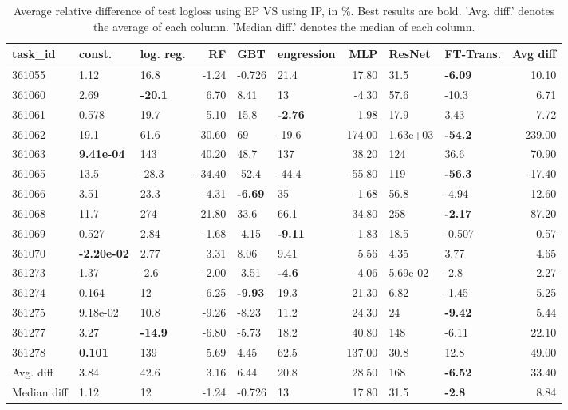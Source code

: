 \begin{table}[ht!]
\centering
\begingroup\footnotesize
\begin{tabular}{lllrllrllr}
  \hline
\hline
task\_id & const. & log. reg. & RF & GBT & engression & MLP & ResNet & FT-Trans. & Avg diff \\ 
  \hline
361055 & 1.12 & 16.8 & -1.24 & -0.726 & 21.4 & 17.80 & 31.5 & \textbf{-6.09} & 10.10 \\ 
  361060 & 2.69 & \textbf{-20.1} & 6.70 & 8.41 & 13 & -4.30 & 57.6 & -10.3 & 6.71 \\ 
  361061 & 0.578 & 19.7 & 5.10 & 15.8 & \textbf{-2.76} & 1.98 & 17.9 & 3.43 & 7.72 \\ 
  361062 & 19.1 & 61.6 & 30.60 & 69 & -19.6 & 174.00 &  1.63e+03 & \textbf{-54.2} & 239.00 \\ 
  361063 & \textbf{ 9.41e-04} & 143 & 40.20 & 48.7 & 137 & 38.20 & 124 & 36.6 & 70.90 \\ 
  361065 & 13.5 & -28.3 & -34.40 & -52.4 & -44.4 & -55.80 & 119 & \textbf{-56.3} & -17.40 \\ 
  361066 & 3.51 & 23.3 & -4.31 & \textbf{-6.69} & 35 & -1.68 & 56.8 & -4.94 & 12.60 \\ 
  361068 & 11.7 & 274 & 21.80 & 33.6 & 66.1 & 34.80 & 258 & \textbf{-2.17} & 87.20 \\ 
  361069 & 0.527 & 2.84 & -1.68 & -4.15 & \textbf{-9.11} & -1.83 & 18.5 & -0.507 & 0.57 \\ 
  361070 & \textbf{-2.20e-02} & 2.77 & 3.31 & 8.06 & 9.41 & 5.56 & 4.35 & 3.77 & 4.65 \\ 
  361273 & 1.37 & -2.6 & -2.00 & -3.51 & \textbf{-4.6} & -4.06 &  5.69e-02 & -2.8 & -2.27 \\ 
  361274 & 0.164 & 12 & -6.25 & \textbf{-9.93} & 19.3 & 21.30 & 6.82 & -1.45 & 5.25 \\ 
  361275 &  9.18e-02 & 10.8 & -9.26 & -8.23 & 11.2 & 24.30 & 24 & \textbf{-9.42} & 5.44 \\ 
  361277 & 3.27 & \textbf{-14.9} & -6.80 & -5.73 & 18.2 & 40.80 & 148 & -6.11 & 22.10 \\ 
  361278 & \textbf{0.101} & 139 & 5.69 & 4.45 & 62.5 & 137.00 & 30.8 & 12.8 & 49.00 \\ 
   \hline
Avg. diff & 3.84 & 42.6 & 3.16 & 6.44 & 20.8 & 28.50 & 168 & \textbf{-6.52} & 33.40 \\ 
  Median diff & 1.12 & 12 & -1.24 & -0.726 & 13 & 17.80 & 31.5 & \textbf{-2.8} & 8.84 \\ 
   \hline
\hline
\end{tabular}
\endgroup
\caption{Average relative difference of test logloss using EP VS using IP, in \%. 
                  Best results are bold. 
                  'Avg. diff.' denotes the average of each column.
                  'Median diff.' denotes the median of each column.} 
\label{TABLES/table_results_clustering_logloss_only_num_features_EP_VS_IP}
\end{table}
